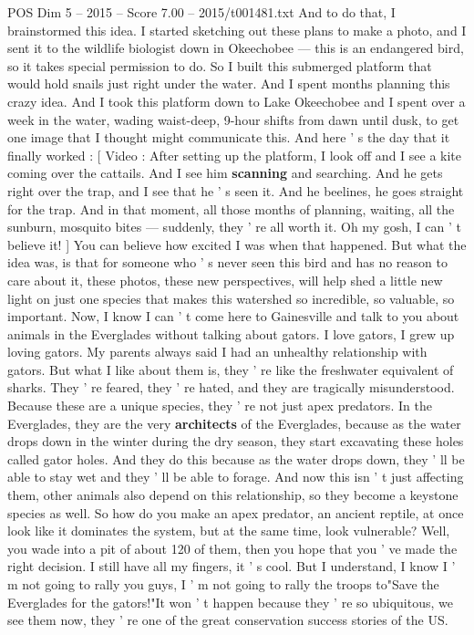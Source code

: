 \begin{textsample}{POS Dim 5 – 2015 – Score 7.00 – 2015/t001481.txt}
And to do that, I brainstormed this idea.
I started sketching out these plans to make a photo, and I sent it to the wildlife biologist down in Okeechobee — this is an endangered bird, so it takes special permission to do.
So I built this submerged platform that would hold snails just right under the water.
And I spent months planning this crazy idea.
And I took this platform down to Lake Okeechobee and I spent over a week in the water, wading waist-deep, 9-hour shifts from dawn until dusk, to get one image that I thought might communicate this.
And here ' s the day that it finally worked : [ Video : After setting up the platform, I look off and I see a kite coming over the cattails.
And I see him \textbf{scanning} and searching.
And he gets right over the trap, and I see that he ' s seen it.
And he beelines, he goes straight for the trap.
And in that moment, all those months of planning, waiting, all the sunburn, mosquito bites — suddenly, they ' re all worth it.
Oh my gosh, I can ' t believe it! ] You can believe how excited I was when that happened.
But what the idea was, is that for someone who ' s never seen this bird and has no reason to care about it, these photos, these new perspectives, will help shed a little new light on just one species that makes this watershed so incredible, so valuable, so important.
Now, I know I can ' t come here to Gainesville and talk to you about animals in the Everglades without talking about gators.
I love gators, I grew up loving gators.
My parents always said I had an unhealthy relationship with gators.
But what I like about them is, they ' re like the freshwater equivalent of sharks.
They ' re feared, they ' re hated, and they are tragically misunderstood.
Because these are a unique species, they ' re not just apex predators.
In the Everglades, they are the very \textbf{architects} of the Everglades, because as the water drops down in the winter during the dry season, they start excavating these holes called gator holes.
And they do this because as the water drops down, they ' ll be able to stay wet and they ' ll be able to forage.
And now this isn ' t just affecting them, other animals also depend on this relationship, so they become a keystone species as well.
So how do you make an apex predator, an ancient reptile, at once look like it dominates the system, but at the same time, look vulnerable?
Well, you wade into a pit of about 120 of them, then you hope that you ' ve made the right decision.
I still have all my fingers, it ' s cool.
But I understand, I know I ' m not going to rally you guys, I ' m not going to rally the troops to"Save the Everglades for the gators!"It won ' t happen because they ' re so ubiquitous, we see them now, they ' re one of the great conservation success stories of the US.

\end{textsample}
